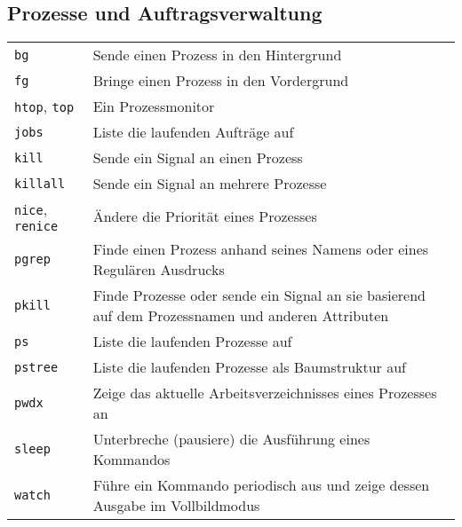 \documentclass[10pt,a4paper]{article}
\begin{document}
\begin{multicols}{2}
\section{Prozesse und Auftragsverwaltung}
\begin{tabular}{ p{2.5cm} p{8.5cm} }
  \hline
  \texttt{bg} & Sende einen Prozess in den Hintergrund \\
  \rowcolor{Gray}
  \texttt{fg} & Bringe einen Prozess in den Vordergrund \\
  \texttt{htop}, \texttt{top} & Ein Prozessmonitor \\
  \rowcolor{Gray}
  \texttt{jobs} & Liste die laufenden Aufträge auf \\
  \texttt{kill} & Sende ein Signal an einen Prozess \\
  \rowcolor{Gray}
  \texttt{killall} & Sende ein Signal an mehrere Prozesse\\
  \texttt{nice}, \texttt{renice} & Ändere die Priorität eines Prozesses \\
  \rowcolor{Gray}
  \texttt{pgrep} & Finde einen Prozess anhand seines Namens oder eines Regulären Ausdrucks \\
  \texttt{pkill} & Finde Prozesse oder sende ein Signal an sie basierend auf dem Prozessnamen und anderen Attributen\\
  \rowcolor{Gray}
  \texttt{ps} & Liste die laufenden Prozesse auf \\
  \texttt{pstree} & Liste die laufenden Prozesse als Baumstruktur auf \\
  \rowcolor{Gray}
  \texttt{pwdx} & Zeige das aktuelle Arbeitsverzeichnisses eines Prozesses an \\
  \texttt{sleep} & Unterbreche (pausiere) die Ausführung eines Kommandos \\
  \rowcolor{Gray}
  \texttt{watch} & Führe ein Kommando periodisch aus und zeige dessen Ausgabe im Vollbildmodus \\
  \hline
\end{tabular}


\end{multicols}
\end{document}
